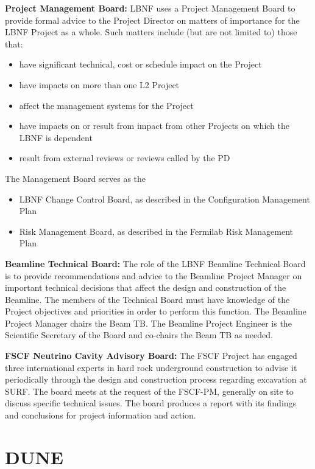 \textbf{Project Management Board:} LBNF uses a Project Management Board to provide formal advice to the Project Director on matters of importance for the LBNF Project as a whole. Such matters include (but are not limited to) those that:
\begin{itemize}
\item have significant technical, cost or schedule impact on the Project
\item have impacts on more than one L2 Project
\item affect the management systems for the Project
\item have impacts on or result from impact from other Projects on which the LBNF is dependent
\item result from external reviews or reviews called by the PD
\end{itemize}
The Management Board serves as the
\begin{itemize}
\item LBNF Change Control Board, as described in the Configuration Management Plan \fixme{[ref]}
\item Risk Management Board, as described in the Fermilab Risk Management Plan  \fixme{[ref]}
\end{itemize}

\textbf{Beamline Technical Board:} The role of the LBNF Beamline Technical Board is to provide recommendations and advice to the Beamline Project Manager on important technical decisions that affect the design and construction of the Beamline. The members of the Technical Board must have knowledge of the Project objectives and priorities in order to perform this function. The Beamline Project Manager chairs the Beam TB. The Beamline Project Engineer is the Scientific Secretary of the Board and co-chairs the Beam TB as needed. 

\textbf{FSCF Neutrino Cavity Advisory Board:} The FSCF Project has engaged three international experts in hard rock underground construction to advise it periodically through the design and construction process regarding excavation at SURF. The board meets at the request of the FSCF-PM, generally on site to discuss specific technical issues. The board produces a report with its findings and conclusions for project information and action. 



\section{DUNE}

